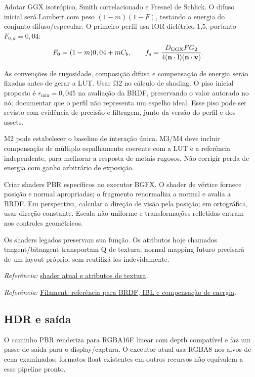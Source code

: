 \documentclass[11pt,a4paper]{article}
\newcommand{\src}[2]{\par{\small\textit{Referência:} \href{#1}{#2}.}\par}
\begin{document}
Adotar GGX isotrópico, Smith correlacionado e Fresnel de Schlick. O difuso inicial será Lambert com peso $(1-m)(1-F)$, testando a energia do conjunto difuso/especular. O primeiro perfil usa IOR dielétrico 1,5, portanto $F_{0,d}=0,04$:
\begin{equation}
F_0=(1-m)0,04+mC_b,\qquad
f_s=\frac{D_{\rm GGX}FG_2}{4(\mathbf n\cdot\mathbf l)(\mathbf n\cdot\mathbf v)}.
\end{equation}

As convenções de rugosidade, composição difusa e compensação de energia serão fixadas antes de gerar a LUT. Usar f32 no cálculo de shading. O piso inicial proposto é $r_{\min}=0,045$ na avaliação da BRDF, preservando o valor autorado no nó; documentar que o perfil não representa um espelho ideal. Esse piso pode ser revisto com evidência de precisão e filtragem, junto da versão do perfil e dos assets.

M2 pode estabelecer o baseline de interação única. M3/M4 deve incluir compensação de múltiplo espalhamento coerente com a LUT e a referência independente, para melhorar a resposta de metais rugosos. Não corrigir perda de energia com ganho arbitrário de exposição.

Criar shaders PBR específicos no executor BGFX. O shader de vértice fornece posição e normal apropriadas; o fragmento renormaliza a normal e avalia a BRDF. Em perspectiva, calcular a direção de visão pela posição; em ortográfica, usar direção constante. Escala não uniforme e transformações refletidas entram nos controles geométricos.

Os shaders legados preservam sua função. Os atributos hoje chamados tangent/bitangent transportam Q de textura; normal mapping futuro precisará de um layout próprio, sem reutilizá-los indevidamente.
\src{/mnt/Laranja/Git/externos/coin-render/src/rendering/coinbgfx/shaders/vs_base_color.sc}{shader atual e atributos de textura}
\src{https://google.github.io/filament/main/filament.html}{Filament: referência para BRDF, IBL e compensação de energia}

\subsection{HDR e saída}

O caminho PBR renderiza para RGBA16F linear com depth compatível e faz um passe de saída para o display/captura. O executor atual usa RGBA8 nos alvos de cena examinados; formatos float existentes em outros recursos não equivalem a esse pipeline pronto.
\end{document}
